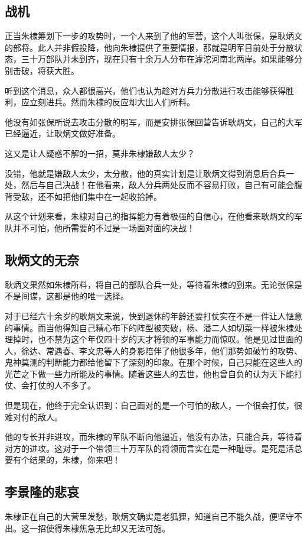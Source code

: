 \begin{multicols}{\theparacolNo}
		\subsection{战机}
		正当朱棣筹划下一步的攻势时，一个人来到了他的军营，这个人叫张保，是耿炳文的部将。此人并非假投降，他向朱棣提供了重要情报，那就是明军目前处于分散状态，三十万部队并未到齐，现在只有十余万人分布在滹沱河南北两岸。如果能够分别击破，将获大胜。

		听到这个消息，众人都很高兴，他们也认为趁对方兵力分散进行攻击能够获得胜利，应立刻进兵。然而朱棣的反应却大出人们所料。

		他没有如张保所说去攻击分散的明军，而是安排张保回营告诉耿炳文，自己的大军已经逼近，让耿炳文做好准备。

		这又是让人疑惑不解的一招，莫非朱棣嫌敌人太少？

		没错，他就是嫌敌人太少，太分散，他的真实计划是让耿炳文得到消息后合兵一处，然后与自己决战！在他看来，敌人分兵两处反而不容易打败，自己有可能会腹背受敌，还不如把他们集中在一起收拾掉。

		从这个计划来看，朱棣对自己的指挥能力有着极强的自信心，在他看来耿炳文的军队并不可怕，他所需要的不过是一场面对面的决战！

		\subsection{耿炳文的无奈}
		耿炳文果然如朱棣所料，将自己的部队合兵一处，等待着朱棣的到来。无论张保是不是间谍，这都是他的唯一选择。

		对于已经六十余岁的耿炳文来说，快到退休的年龄还要打仗实在不是一件让人惬意的事情。而当他得知自己精心布下的阵型被突破，杨、潘二人如切菜一样被朱棣处理掉时，也不禁为这个年仅四十岁的天才将领的军事能力而惊叹。他是见过世面的人，徐达、常遇春、李文忠等人的身影陪伴了他很多年，他们那势如破竹的攻势、鬼神莫测的判断能力都给他留下了深刻的印象。在那个时候，自己只能在这些人的光芒之下做一些力所能及的事情。随着这些人的去世，他也曾自负的认为天下能打仗、会打仗的人不多了。

		但是现在，他终于完全认识到：自己面对的是一个可怕的敌人，一个很会打仗，很难对付的敌人。

		他的专长并非进攻，而朱棣的军队不断向他逼近，他没有办法，只能合兵，等待着对方的进攻。这对于一个带领三十万军队的将领而言实在是一种耻辱。是死是活总要有个结果的，朱棣，你来吧！

		\subsection{李景隆的悲哀}
		朱棣正在自己的大营里发愁，耿炳文确实是老狐狸，知道自己不能久战，便坚守不出。这一招使得朱棣焦急无比却又无法可施。


\end{multicols}
